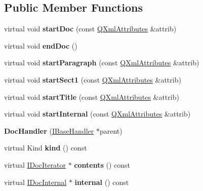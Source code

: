 \subsection*{Public Member Functions}
\begin{DoxyCompactItemize}
\item 
\mbox{\label{class_doc_handler_ad095922acf6d2612896e206d2fe7328c}} 
virtual void {\bfseries start\+Doc} (const \mbox{\hyperlink{class_q_xml_attributes}{Q\+Xml\+Attributes}} \&attrib)
\item 
\mbox{\label{class_doc_handler_a2344eeac2cca9568c3d62c24f24a075c}} 
virtual void {\bfseries end\+Doc} ()
\item 
\mbox{\label{class_doc_handler_a2da7af12ac55a2d510eb7fc106916b22}} 
virtual void {\bfseries start\+Paragraph} (const \mbox{\hyperlink{class_q_xml_attributes}{Q\+Xml\+Attributes}} \&attrib)
\item 
\mbox{\label{class_doc_handler_a7ca413e08d821a5f2fbc1f6002e8297b}} 
virtual void {\bfseries start\+Sect1} (const \mbox{\hyperlink{class_q_xml_attributes}{Q\+Xml\+Attributes}} \&attrib)
\item 
\mbox{\label{class_doc_handler_a8077e2ab801c76468ae056129c66585c}} 
virtual void {\bfseries start\+Title} (const \mbox{\hyperlink{class_q_xml_attributes}{Q\+Xml\+Attributes}} \&attrib)
\item 
\mbox{\label{class_doc_handler_ace8c9543344eb6cf47a03b127c0e7049}} 
virtual void {\bfseries start\+Internal} (const \mbox{\hyperlink{class_q_xml_attributes}{Q\+Xml\+Attributes}} \&attrib)
\item 
\mbox{\label{class_doc_handler_a0636ddbe69594ca581b5b22bb24c0166}} 
{\bfseries Doc\+Handler} (\mbox{\hyperlink{class_i_base_handler}{I\+Base\+Handler}} $\ast$parent)
\item 
\mbox{\label{class_doc_handler_a65035369cf9da764954ca4c2a5189947}} 
virtual Kind {\bfseries kind} () const
\item 
\mbox{\label{class_doc_handler_af7c8b8e5c31942bd7dc4fb6b70fe5758}} 
virtual \mbox{\hyperlink{class_i_doc_iterator}{I\+Doc\+Iterator}} $\ast$ {\bfseries contents} () const
\item 
\mbox{\label{class_doc_handler_adc8c36105f23f0e9fa1c2af18d872072}} 
virtual \mbox{\hyperlink{class_i_doc_internal}{I\+Doc\+Internal}} $\ast$ {\bfseries internal} () const
\end{DoxyCompactItemize}
